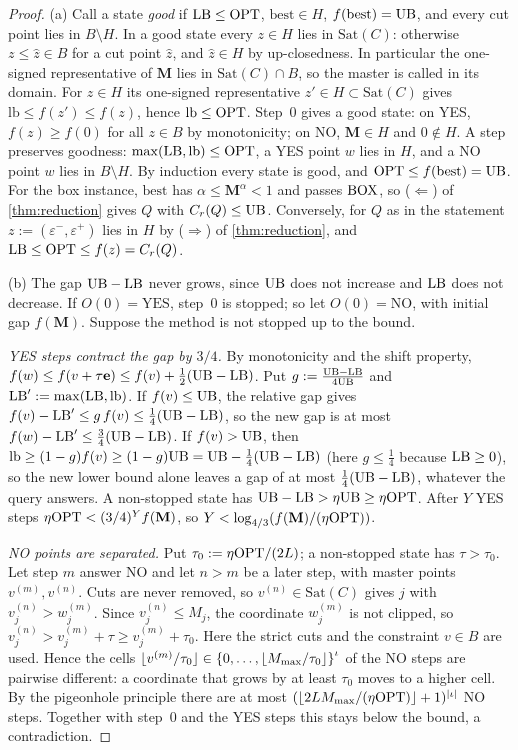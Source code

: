 \begin{proof}
(a) Call a state \emph{good} if $\mathrm{LB}\le\mathrm{OPT}$, $\mathrm{best}\in H$, $f(\mathrm{best})=\mathrm{UB}$, and every cut point lies in $B\setminus H$. In a good state every $z\in H$ lies in $\mathrm{Sat}(C)$: otherwise $z\le\hat z\in B$ for a cut point $\hat z$, and $\hat z\in H$ by up-closedness. In particular the one-signed representative of $\mathbf M$ lies in $\mathrm{Sat}(C)\cap B$, so the master is called in its domain. For $z\in H$ its one-signed representative $z'\in H\subset\mathrm{Sat}(C)$ gives $\mathrm{lb}\le f(z')\le f(z)$, hence $\mathrm{lb}\le\mathrm{OPT}$. Step~0 gives a good state: on YES, $f(z)\ge f(0)$ for all $z\in B$ by monotonicity; on NO, $\mathbf M\in H$ and $0\notin H$. A step preserves goodness: $\max(\mathrm{LB},\mathrm{lb})\le\mathrm{OPT}$, a YES point $w$ lies in $H$, and a NO point $w$ lies in $B\setminus H$. By induction every state is good, and $\mathrm{OPT}\le f(\mathrm{best})=\mathrm{UB}$. For the box instance, $\mathrm{best}$ has $\alpha\le\mathbf M^\alpha<1$ and passes $\mathrm{BOX}$, so ($\Leftarrow$) of \cref{thm:reduction} gives $Q$ with $C_r(Q)\le\mathrm{UB}$. Conversely, for $Q$ as in the statement $z:=(\varepsilon^-,\varepsilon^+)$ lies in $H$ by ($\Rightarrow$) of \cref{thm:reduction}, and $\mathrm{LB}\le\mathrm{OPT}\le f(z)=C_r(Q)$.

(b) The gap $\mathrm{UB}-\mathrm{LB}$ never grows, since $\mathrm{UB}$ does not increase and $\mathrm{LB}$ does not decrease. If $O(0)=\mathrm{YES}$, step~0 is stopped; so let $O(0)=\mathrm{NO}$, with initial gap $f(\mathbf M)$. Suppose the method is not stopped up to the bound.

\emph{YES steps contract the gap by $3/4$.} By monotonicity and the shift property, $f(w)\le f(v+\tau\mathbf e)\le f(v)+\frac12(\mathrm{UB}-\mathrm{LB})$. Put $g:=\frac{\mathrm{UB}-\mathrm{LB}}{4\mathrm{UB}}$ and $\mathrm{LB}':=\max(\mathrm{LB},\mathrm{lb})$. If $f(v)\le\mathrm{UB}$, the relative gap gives $f(v)-\mathrm{LB}'\le g\,f(v)\le\frac14(\mathrm{UB}-\mathrm{LB})$, so the new gap is at most $f(w)-\mathrm{LB}'\le\frac34(\mathrm{UB}-\mathrm{LB})$. If $f(v)>\mathrm{UB}$, then $\mathrm{lb}\ge(1-g)f(v)\ge(1-g)\mathrm{UB}=\mathrm{UB}-\frac14(\mathrm{UB}-\mathrm{LB})$ (here $g\le\frac14$ because $\mathrm{LB}\ge0$), so the new lower bound alone leaves a gap of at most $\frac14(\mathrm{UB}-\mathrm{LB})$, whatever the query answers. A non-stopped state has $\mathrm{UB}-\mathrm{LB}>\eta\mathrm{UB}\ge\eta\mathrm{OPT}$. After $Y$ YES steps $\eta\mathrm{OPT}<(3/4)^Yf(\mathbf M)$, so $Y<\log_{4/3}(f(\mathbf M)/(\eta\mathrm{OPT}))$.

\emph{NO points are separated.} Put $\tau_0:=\eta\mathrm{OPT}/(2L)$; a non-stopped state has $\tau>\tau_0$. Let step $m$ answer NO and let $n>m$ be a later step, with master points $v^{(m)},v^{(n)}$. Cuts are never removed, so $v^{(n)}\in\mathrm{Sat}(C)$ gives $j$ with $v^{(n)}_j>w^{(m)}_j$. Since $v^{(n)}_j\le M_j$, the coordinate $w^{(m)}_j$ is not clipped, so $v^{(n)}_j>v^{(m)}_j+\tau\ge v^{(m)}_j+\tau_0$. Here the strict cuts and the constraint $v\in B$ are used. Hence the cells $\lfloor v^{(m)}/\tau_0\rfloor\in\left\{ 0,\dots,\lfloor M_{\max}/\tau_0\rfloor \right\}^\iota$ of the NO steps are pairwise different: a coordinate that grows by at least $\tau_0$ moves to a higher cell. By the pigeonhole principle there are at most $(\lfloor 2LM_{\max}/(\eta\mathrm{OPT})\rfloor+1)^{\left\lvert \iota \right\rvert}$ NO steps. Together with step~0 and the YES steps this stays below the bound, a contradiction.
\end{proof}

